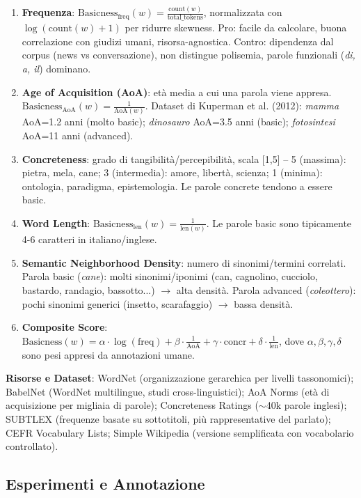 \documentclass[12pt,a4paper]{article}
\begin{document}
\begin{enumerate}
  \item \textbf{Frequenza}: $\text{Basicness}_{\text{freq}}(w) = \frac{\text{count}(w)}{\text{total\_tokens}}$, normalizzata con $\log(\text{count}(w)+1)$ per ridurre skewness. Pro: facile da calcolare, buona correlazione con giudizi umani, risorsa-agnostica. Contro: dipendenza dal corpus (news vs conversazione), non distingue polisemia, parole funzionali (\textit{di, a, il}) dominano.
  \item \textbf{Age of Acquisition (AoA)}: et\`a media a cui una parola viene appresa. $\text{Basicness}_{\text{AoA}}(w) = \frac{1}{\text{AoA}(w)}$. Dataset di Kuperman et al. (2012): \textit{mamma} AoA=1.2 anni (molto basic); \textit{dinosauro} AoA=3.5 anni (basic); \textit{fotosintesi} AoA=11 anni (advanced).
  \item \textbf{Concreteness}: grado di tangibilit\`a/percepibilit\`a, scala [1,5] -- 5 (massima): pietra, mela, cane; 3 (intermedia): amore, libert\`a, scienza; 1 (minima): ontologia, paradigma, epistemologia. Le parole concrete tendono a essere basic.
  \item \textbf{Word Length}: $\text{Basicness}_{\text{len}}(w) = \frac{1}{\text{len}(w)}$. Le parole basic sono tipicamente 4-6 caratteri in italiano/inglese.
  \item \textbf{Semantic Neighborhood Density}: numero di sinonimi/termini correlati. Parola basic (\textit{cane}): molti sinonimi/iponimi (can, cagnolino, cucciolo, bastardo, randagio, bassotto...) $\to$ alta densit\`a. Parola advanced (\textit{coleottero}): pochi sinonimi generici (insetto, scarafaggio) $\to$ bassa densit\`a.
  \item \textbf{Composite Score}: $\text{Basicness}(w) = \alpha \cdot \log(\text{freq}) + \beta \cdot \frac{1}{\text{AoA}} + \gamma \cdot \text{concr} + \delta \cdot \frac{1}{\text{len}}$, dove $\alpha,\beta,\gamma,\delta$ sono pesi appresi da annotazioni umane.
\end{enumerate}

\textbf{Risorse e Dataset}: WordNet (organizzazione gerarchica per livelli tassonomici); BabelNet (WordNet multilingue, studi cross-linguistici); AoA Norms (et\`a di acquisizione per migliaia di parole); Concreteness Ratings ($\sim$40k parole inglesi); SUBTLEX (frequenze basate su sottotitoli, pi\`u rappresentative del parlato); CEFR Vocabulary Lists; Simple Wikipedia (versione semplificata con vocabolario controllato).

\subsection{Esperimenti e Annotazione}
\end{document}
